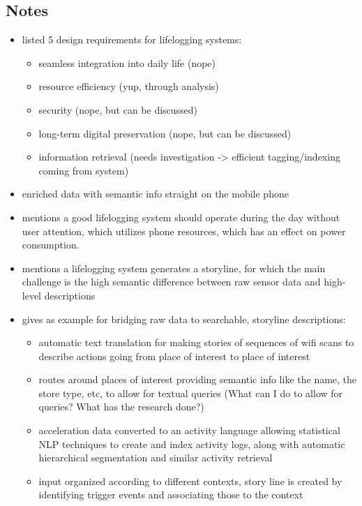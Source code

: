 \subsection{Notes}

\begin{itemize}
	\item \cite{rawassizadeh2013ubiqlog} listed 5 design requirements for lifelogging systems:
	\begin{itemize}
		\item seamless integration into daily life (nope)
		\item resource efficiency (yup, through analysis)
		\item security (nope, but can be discussed)
		\item long-term digital preservation (nope, but can be discussed)
		\item information retrieval (needs investigation -> efficient tagging/indexing coming from system)
	\end{itemize}
	\item \cite{rawassizadeh2013ubiqlog} enriched data with semantic info straight on the mobile phone
	\item \cite{bayindir2017survey} mentions a good lifelogging system should operate during the day without user attention, which utilizes phone resources, which has an effect on power consumption.
	\item \cite{bayindir2017survey} mentions a lifelogging system generates a storyline, for which the main challenge is the high semantic difference between raw sensor data and high-level descriptions
	\item \cite{bayindir2017survey} gives as example for bridging raw data to searchable, storyline descriptions:
	\begin{itemize}
		\item automatic text translation for making stories of sequences of wifi scans to describe actions going from place of interest to place of interest
		\item routes around places of interest providing semantic info like the name, the store type, etc, to allow for textual queries (What can I do to allow for queries? What has the research done?)
		\item acceleration data converted to an activity language allowing statistical NLP techniques to create and index activity logs, along with automatic hierarchical segmentation and similar activity retrieval
		\item input organized according to different contexts, story line is created by identifying trigger events and associating those to the context

\end{itemize}
\end{itemize}
